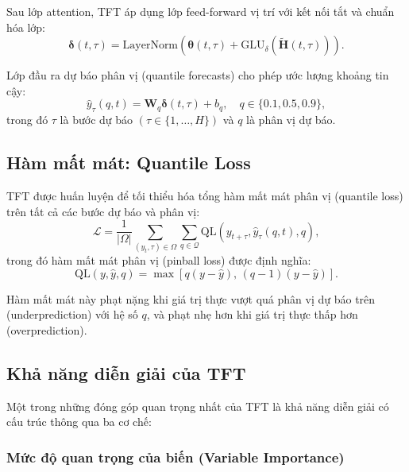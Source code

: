 Sau lớp attention, TFT áp dụng lớp feed-forward vị trí với kết nối tắt và chuẩn hóa lớp:
\begin{equation}
    \boldsymbol{\delta}(t, \tau) = \text{LayerNorm}\!\left(\boldsymbol{\theta}(t, \tau) + \text{GLU}_{\delta}\!\left(\tilde{\mathbf{H}}(t, \tau)\right)\right).
    \label{eq:ffn_gate}
\end{equation}

Lớp đầu ra dự báo phân vị (quantile forecasts) cho phép ước lượng khoảng tin cậy:
\begin{equation}
    \hat{y}_\tau(q, t) = \mathbf{W}_q \boldsymbol{\delta}(t, \tau) + b_q, \quad q \in \{0.1, 0.5, 0.9\},
    \label{eq:quantile_output}
\end{equation}
trong đó $\tau$ là bước dự báo $(\tau \in \{1, \ldots, H\})$ và $q$ là phân vị dự báo.

\subsection{Hàm mất mát: Quantile Loss}
\label{subsec:quantile_loss}

TFT được huấn luyện để tối thiểu hóa tổng hàm mất mát phân vị (quantile loss) trên tất cả các bước dự báo và phân vị:
\begin{equation}
    \mathcal{L} = \frac{1}{|\Omega|} \sum_{(y_t,\tau) \in \Omega} \sum_{q \in \mathcal{Q}} \text{QL}(y_{t+\tau}, \hat{y}_\tau(q, t), q),
    \label{eq:total_loss}
\end{equation}
trong đó hàm mất mát phân vị (pinball loss) được định nghĩa:
\begin{equation}
    \text{QL}(y, \hat{y}, q) = \max\!\left[q(y - \hat{y}),\, (q-1)(y - \hat{y})\right].
    \label{eq:quantile_loss}
\end{equation}

Hàm mất mát này phạt nặng khi giá trị thực vượt quá phân vị dự báo trên (underprediction) với hệ số $q$, và phạt nhẹ hơn khi giá trị thực thấp hơn (overprediction).

\subsection{Khả năng diễn giải của TFT}
\label{subsec:tft_interpretability}

Một trong những đóng góp quan trọng nhất của TFT là khả năng diễn giải có cấu trúc thông qua ba cơ chế:

\subsubsection{Mức độ quan trọng của biến (Variable Importance)}

